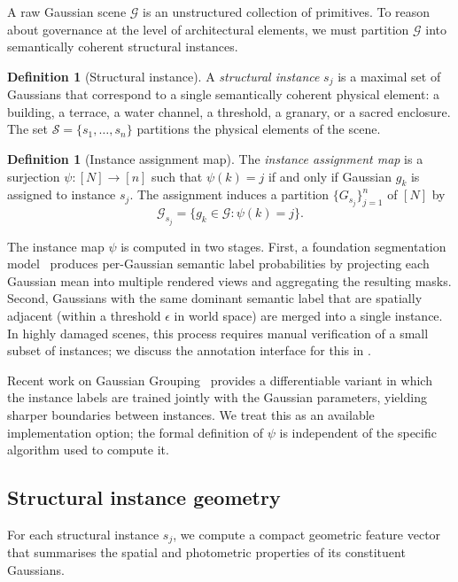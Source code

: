 \documentclass[11pt,a4paper]{article}
\theoremstyle{plain}
\theoremstyle{definition}
\newtheorem{definition}[theorem]{Definition}
\theoremstyle{remark}
\newcommand{\GS}{\mathcal{G}}
\newcommand{\Struc}{\mathcal{S}}
\newcommand{\inst}{\psi}
\begin{document}
A raw Gaussian scene $\GS$ is an unstructured collection of primitives.
To reason about governance at the level of architectural elements, we
must partition $\GS$ into semantically coherent structural instances.

\begin{definition}[Structural instance]
\label{def:structural_instance}
A \emph{structural instance} $s_j$ is a maximal set of Gaussians that
correspond to a single semantically coherent physical element: a
building, a terrace, a water channel, a threshold, a granary, or a
sacred enclosure. The set $\Struc = \{s_1, \ldots, s_n\}$ partitions
the physical elements of the scene.
\end{definition}

\begin{definition}[Instance assignment map]
\label{def:psi}
The \emph{instance assignment map} is a surjection
$\inst : [N] \to [n]$ such that $\inst(k) = j$ if and only if Gaussian
$g_k$ is assigned to instance $s_j$. The assignment induces a partition
$\{G_{s_j}\}_{j=1}^n$ of $[N]$ by
\[
  \GS_{s_j} = \bigl\{g_k \in \GS : \inst(k) = j\bigr\}.
\]
\end{definition}

The instance map $\inst$ is computed in two stages. First, a
foundation segmentation model~\cite{kirillov2023sam} produces
per-Gaussian semantic label probabilities by projecting each Gaussian
mean into multiple rendered views and aggregating the resulting masks.
Second, Gaussians with the same dominant semantic label that are
spatially adjacent (within a threshold $\epsilon$ in world space) are
merged into a single instance. In highly damaged scenes, this process
requires manual verification of a small subset of instances; we discuss
the annotation interface for this in .

Recent work on Gaussian Grouping~\cite{ye2024gaussian} provides a
differentiable variant in which the instance labels are trained jointly
with the Gaussian parameters, yielding sharper boundaries between
instances. We treat this as an available implementation option; the
formal definition of $\inst$ is independent of the specific algorithm
used to compute it.

\subsection{Structural instance geometry}
\label{sec:layer1_geom}

For each structural instance $s_j$, we compute a compact geometric
feature vector that summarises the spatial and photometric properties
of its constituent Gaussians.
\end{document}

